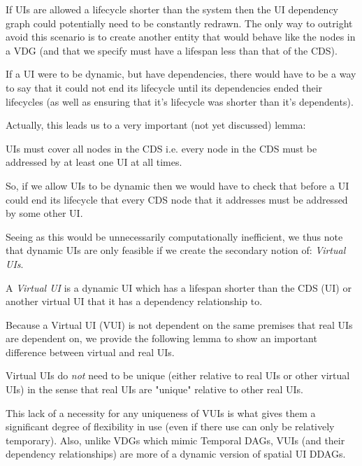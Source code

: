 If UIs are allowed a lifecycle shorter than the system then the UI dependency graph could potentially need to be constantly redrawn. The only way to outright avoid this scenario is to create another entity that would behave like the nodes in a VDG (and that we specify must have a lifespan less than that of the CDS).

If a UI were to be dynamic, but have dependencies, there would have to be a way to say that it could not end its lifecycle until its dependencies ended their lifecycles (as well as ensuring that it's lifecycle was shorter than it's dependents).

Actually, this leads us to a very important (not yet discussed) lemma: 

\begin{con-lem}[]
	UIs must cover all nodes in the CDS i.e. every node in the CDS must be addressed by at least one UI at all times. 
\end{con-lem}

So, if we allow UIs to be dynamic then we would have to check that before a UI could end its lifecycle that every CDS node that it addresses must be addressed by some other UI. 

Seeing as this would be unnecessarily computationally inefficient, we thus note that dynamic UIs are only feasible if we create the secondary notion of: \textit{Virtual UIs}.

\begin{con-def}[Virtual UI]
	\label{virtual-ui}
	A \textit{Virtual UI} is a dynamic UI which has a lifespan shorter than the CDS (UI) or another virtual UI that it has a dependency relationship to.
\end{con-def}

Because a Virtual UI (VUI) is not dependent on the same premises that real UIs are dependent on, we provide the following lemma to show an important difference between virtual and real UIs.

\begin{con-lem}[]
	Virtual UIs do \textit{not} need to be unique  (either relative to real UIs or other virtual UIs) in the sense that real UIs are "unique" relative to other real UIs.
\end{con-lem}

This lack of a necessity for any uniqueness of VUIs is what gives them a significant degree of flexibility in use (even if there use can only be relatively temporary). Also, unlike VDGs which mimic Temporal DAGs, VUIs (and their dependency relationships) are more of a dynamic version of spatial UI DDAGs.

